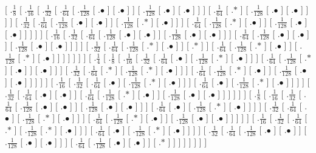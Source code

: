 \documentclass[a4paper,10pt]{article}
\begin{document}
\begin{landscape}
{ [ .$\frac{1}{8}$  [ .$\frac{1}{16}$  [ .$\frac{1}{32}$  [ .$\frac{1}{64}$  [ .$\frac{1}{128}$  [ .$\bullet$ ]  [ .$\bullet$ ]  ]  [ .$\frac{1}{128}$  [ .$\bullet$ ]  [ .$\bullet$ ]  ]  ]  [ .$\frac{1}{64}$  [ .$*$ ]  [ .$\frac{1}{128}$  [ .$\bullet$ ]  [ .$\bullet$ ]  ]  ]  ]  [ .$\frac{1}{32}$  [ .$\frac{1}{64}$  [ .$\frac{1}{128}$  [ .$\bullet$ ]  [ .$\bullet$ ]  ]  [ .$\frac{1}{128}$  [ .$*$ ]  [ .$\bullet$ ]  ]  ]  [ .$\frac{1}{64}$  [ .$\frac{1}{128}$  [ .$*$ ]  [ .$\bullet$ ]  ]  [ .$\frac{1}{128}$  [ .$\bullet$ ]  [ .$\bullet$ ]  ]  ]  ]  ]  [ .$\frac{1}{16}$  [ .$\frac{1}{32}$  [ .$\frac{1}{64}$  [ .$\frac{1}{128}$  [ .$\bullet$ ]  [ .$\bullet$ ]  ]  [ .$\frac{1}{128}$  [ .$\bullet$ ]  [ .$\bullet$ ]  ]  ]  [ .$\frac{1}{64}$  [ .$\frac{1}{128}$  [ .$\bullet$ ]  [ .$\bullet$ ]  ]  [ .$\frac{1}{128}$  [ .$\bullet$ ]  [ .$\bullet$ ]  ]  ]  ]  [ .$\frac{1}{32}$  [ .$\frac{1}{64}$  [ .$\frac{1}{128}$  [ .$*$ ]  [ .$\bullet$ ]  ]  [ .$*$ ]  ]  [ .$\frac{1}{64}$  [ .$\frac{1}{128}$  [ .$*$ ]  [ .$\bullet$ ]  ]  [ .$\frac{1}{128}$  [ .$*$ ]  [ .$\bullet$ ]  ]  ]  ]  ]  ]  ]  [ .$\frac{1}{4}$  [ .$\frac{1}{8}$  [ .$\frac{1}{16}$  [ .$\frac{1}{32}$  [ .$\frac{1}{64}$  [ .$\bullet$ ]  [ .$\frac{1}{128}$  [ .$*$ ]  [ .$\bullet$ ]  ]  ]  [ .$\frac{1}{64}$  [ .$\frac{1}{128}$  [ .$*$ ]  [ .$\bullet$ ]  ]  [ .$\bullet$ ]  ]  ]  [ .$\frac{1}{32}$  [ .$\frac{1}{64}$  [ .$*$ ]  [ .$\frac{1}{128}$  [ .$*$ ]  [ .$\bullet$ ]  ]  ]  [ .$\frac{1}{64}$  [ .$\frac{1}{128}$  [ .$*$ ]  [ .$\bullet$ ]  ]  [ .$\frac{1}{128}$  [ .$\bullet$ ]  [ .$\bullet$ ]  ]  ]  ]  ]  [ .$\frac{1}{16}$  [ .$\frac{1}{32}$  [ .$\frac{1}{64}$  [ .$\bullet$ ]  [ .$\frac{1}{128}$  [ .$*$ ]  [ .$\bullet$ ]  ]  ]  [ .$\frac{1}{64}$  [ .$\bullet$ ]  [ .$\frac{1}{128}$  [ .$*$ ]  [ .$\bullet$ ]  ]  ]  ]  [ .$\frac{1}{32}$  [ .$\frac{1}{64}$  [ .$\bullet$ ]  [ .$\bullet$ ]  ]  [ .$\frac{1}{64}$  [ .$\frac{1}{128}$  [ .$*$ ]  [ .$\bullet$ ]  ]  [ .$\frac{1}{128}$  [ .$\bullet$ ]  [ .$\bullet$ ]  ]  ]  ]  ]  ]  [ .$\frac{1}{8}$  [ .$\frac{1}{16}$  [ .$\frac{1}{32}$  [ .$\frac{1}{64}$  [ .$\frac{1}{128}$  [ .$\bullet$ ]  [ .$\bullet$ ]  ]  [ .$\frac{1}{128}$  [ .$\bullet$ ]  [ .$\bullet$ ]  ]  ]  [ .$\frac{1}{64}$  [ .$\bullet$ ]  [ .$\frac{1}{128}$  [ .$*$ ]  [ .$\bullet$ ]  ]  ]  ]  [ .$\frac{1}{32}$  [ .$\frac{1}{64}$  [ .$\bullet$ ]  [ .$\frac{1}{128}$  [ .$*$ ]  [ .$\bullet$ ]  ]  ]  [ .$\frac{1}{64}$  [ .$\frac{1}{128}$  [ .$*$ ]  [ .$\bullet$ ]  ]  [ .$\frac{1}{128}$  [ .$\bullet$ ]  [ .$\bullet$ ]  ]  ]  ]  ]  [ .$\frac{1}{16}$  [ .$\frac{1}{32}$  [ .$\frac{1}{64}$  [ .$*$ ]  [ .$\frac{1}{128}$  [ .$*$ ]  [ .$\bullet$ ]  ]  ]  [ .$\frac{1}{64}$  [ .$\bullet$ ]  [ .$\frac{1}{128}$  [ .$*$ ]  [ .$\bullet$ ]  ]  ]  ]  [ .$\frac{1}{32}$  [ .$\frac{1}{64}$  [ .$\frac{1}{128}$  [ .$\bullet$ ]  [ .$\bullet$ ]  ]  [ .$\frac{1}{128}$  [ .$\bullet$ ]  [ .$\bullet$ ]  ]  ]  [ .$\frac{1}{64}$  [ .$\frac{1}{128}$  [ .$\bullet$ ]  [ .$\bullet$ ]  ]  [ .$*$ ]  ]  ]  ]  ]  ]  ]  ]
}

\end{landscape}
\end{document}
